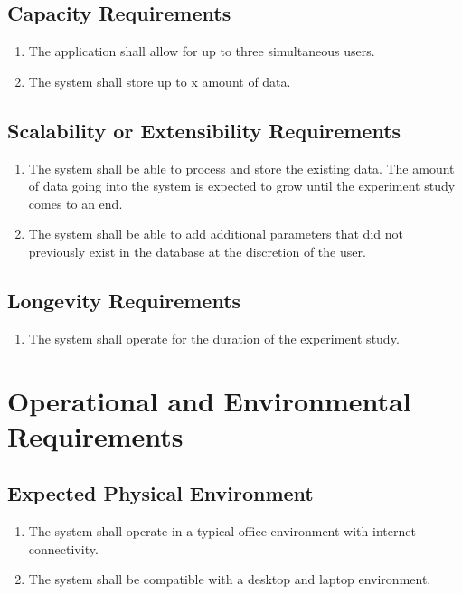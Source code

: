 \documentclass[12pt]{article}
\begin{document}
\subsection{Capacity Requirements}
\begin{enumerate}
  \item The application shall allow for up to three simultaneous users.
  \item The system shall store up to x amount of data.
\end{enumerate}

\subsection{Scalability or Extensibility Requirements}
\begin{enumerate}
  \item The system shall be able to process and store the existing data. The amount of data going into the system is expected to grow until the experiment study comes to an end.
  \item The system shall be able to add additional parameters that did not previously exist in the database at the discretion of the user.
\end{enumerate}

\subsection{Longevity Requirements}
\begin{enumerate}
  \item The system shall operate for the duration of the experiment study.
\end{enumerate}

\section{Operational and Environmental Requirements}
\subsection{Expected Physical Environment}
\begin{enumerate}
  \item The system shall operate in a typical office environment with internet connectivity.
  \item The system shall be compatible with a desktop and laptop environment.
\end{enumerate}
\end{document}
